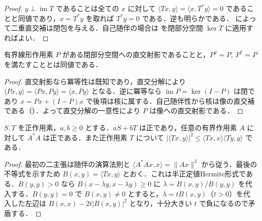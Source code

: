 \begin{proof}
$y\perp\operatorname{im}T$ であることは全ての $x$ に対して $\langle Tx,y\rangle=\langle x,T^*y\rangle=0$ であることと同値であり，$x=T^*y$ を取れば $T^*y=0$ である．逆も明らかである． によって二重直交補は閉包を与える．自己随伴の場合は  を閉部分空間 $\ker T$ に適用すればよい．
\end{proof}
\begin{prop}[直交射影の作用素による特徴づけ]
有界線形作用素 $P$ がある閉部分空間への直交射影であることと，$P^2=P,\ P^*=P$ を満たすこととは同値である．
\end{prop}
\begin{proof}
直交射影なら冪等性は既知であり，直交分解により $\langle Px,y\rangle=\langle Px,Py\rangle=\langle x,Py\rangle$ となる．逆に冪等なら $\operatorname{im}P=\ker(I-P)$ は閉であり $x=Px+(I-P)x$ で後項は核に属する．自己随伴性から核は像の直交補である（）．よって直交分解の一意性により $P$ は像への直交射影である．
\end{proof}
\begin{prop}[正作用素の基本性質]
$S,T$ を正作用素，$a,b\geq0$ とする．$aS+bT$ は正であり，任意の有界作用素 $A$ に対して $A^*A$ は正である．また正作用素 $T$ について $|\langle Tx,y\rangle|^2\leq\langle Tx,x\rangle\langle Ty,y\rangle$ である．
\end{prop}
\begin{proof}
最初の二主張は随伴の演算法則と $\langle A^*Ax,x\rangle=\|Ax\|^2$ から従う．最後の不等式を示すため $B(x,y)=\langle Tx,y\rangle$ とおく．これは半正定値Hermite形式である．$B(y,y)>0$ なら $B(x-\lambda y,x-\lambda y)\geq0$ に $\lambda=B(x,y)/B(y,y)$ を代入する．$B(y,y)=0$ で $B(x,y)\ne0$ とすると，$\lambda=tB(x,y)$（$t>0$）を代入した左辺は $B(x,x)-2t|B(x,y)|^2$ となり，十分大きい $t$ で負になるので矛盾する．
\end{proof}
